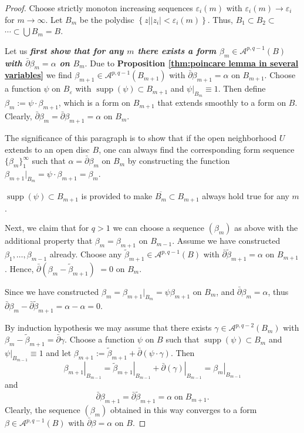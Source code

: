 \begin{proof}
   Choose strictly monoton increasing sequences $\varepsilon_i(m)$ with $\varepsilon_i(m) \rightarrow \varepsilon_i$ for $m \rightarrow \infty$. Let $B_m$ be the polydisc $\left\{z|| z_i \mid<\varepsilon_i(m)\right\}$. Thus, $B_1 \subset B_2 \subset$ $\cdots \subset \bigcup B_m=B$.

Let us \textcolor[rgb]{0.75,0.16,0.44}{\textit{\textbf{first show that for any $m$ there exists a form $\beta_m \in \mathcal{A}^{p, q-1}(B)$ with $\bar{\partial} \beta_m=\alpha$ on $B_m$}}}. Due to \textbf{Proposition \ref{thm:poincare lemma in several variables}} we find $\beta_{m+1} \in \mathcal{A}^{p, q-1}\left(B_{m+1}\right)$ with $\bar{\partial} \beta_{m+1}=\alpha$ on $B_{m+1}$. Choose a function $\psi$ on $B_{\varepsilon}$ with $\operatorname{supp}(\psi) \subset B_{m+1}$ and $\left.\psi\right|_{B_m} \equiv 1$. Then define $\beta_m:=\psi \cdot \beta_{m+1}$, which is a form on $B_{m+1}$ that extends smoothly to a form on $B$. Clearly, $\bar{\partial} \beta_m=\bar{\partial} \beta_{m+1}=\alpha$ on $B_m$.
\begin{note}
  The significance of this paragraph is to show that if the open neighborhood $U$ extends to an open disc $B$, one can always find the corresponding form sequence $\{\beta_m\}_1^\infty$ such that $\alpha=\bar{\partial}\beta_m$ on $B_m$ by constructing the function $\beta_{m+1}\big|_{B_m}=\psi\cdot\beta_{m+1}=\beta_m$.
  
  $\operatorname{supp}(\psi) \subset B_{m+1}$ is provided to make $\overline{B_m}\subset B_{m+1}$ always hold true for any $m$.
\end{note}
Next, we claim that for $q>1$ we can choose a sequence $\left(\beta_m\right)$ as above with the additional property that $\beta_m=\beta_{m+1}$ on $B_{m-1}$. Assume we have constructed $\beta_1, \ldots, \beta_{m-1}$ already. Choose any $\tilde{\beta}_{m+1} \in \mathcal{A}^{p, q-1}(B)$ with $\bar{\partial} \tilde{\beta}_{m+1}=\alpha$ on $B_{m+1}$. Hence, $\bar{\partial}\left(\beta_m-\tilde{\beta}_{m+1}\right)$ $=0$ on $B_m$. 
\begin{note}[]
  Since we have constructed $\beta_m=\beta_{m+1}|_{B_m}=\psi\beta_{m+1}$ on $B_m$, and $\bar{\partial}\beta_m=\alpha$, thus $\bar{\partial}\beta_m-\bar{\partial}\tilde{\beta}_{m+1}=\alpha-\alpha=0$.
\end{note}
By induction hypothesis we may assume that there exists $\gamma \in \mathcal{A}^{p, q-2}\left(B_m\right)$ with $\beta_m-\tilde{\beta}_{m+1}=\bar{\partial} \gamma$.  Choose a function $\psi$ on $B$ such that $\operatorname{supp}(\psi) \subset B_m$ and $\left.\psi\right|_{B_{m-1}} \equiv 1$ and let $\beta_{m+1}:=\tilde{\beta}_{m+1}+\bar{\partial}(\psi \cdot \gamma)$. Then \[\left.\beta_{m+1}\right|_{B_{m-1}}=\left.\tilde{\beta}_{m+1}\right|_{B_{m-1}}+\left.\bar{\partial}(\gamma)\right|_{B_{m-1}}= \left.\beta_m\right|_{B_{m-1}}\]
 and 
 \[\bar{\partial} \beta_{m+1}=\bar{\partial} \tilde{\beta}_{m+1}=\alpha \;\text{on}\; B_{m+1}.\]
  Clearly, the sequence $\left(\beta_m\right)$ obtained in this way converges to a form $\beta \in \mathcal{A}^{p, q-1}(B)$ with $\bar{\partial} \beta=\alpha$ on $B$.


\end{proof}

